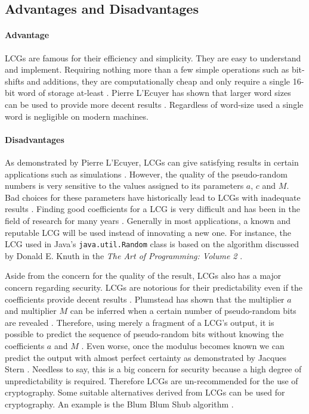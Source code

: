 \subsection{Advantages and Disadvantages}
\paragraph{Advantage} LCGs are famous for their efficiency and simplicity. They are easy to understand and implement. Requiring nothing more than a few simple operations such as bit-shifts and additions, they are computationally cheap \citep{wang_review} and only require a single 16-bit word of storage at-least \citep{yu_random}. Pierre L'Ecuyer has shown that larger word sizes can be used to provide more decent results \citep{lecuyer_tables}. Regardless of word-size used a single word is negligible on modern machines.

\paragraph{Disadvantages} 
As demonstrated by Pierre L'Ecuyer, LCGs can give satisfying results in certain applications such as simulations \citep{lecuyer_lcg_k1}. However, the quality of the pseudo-random numbers is very sensitive to the values assigned to its parameters $a$, $c$ and $M$. Bad choices for these parameters have historically lead to LCGs with inadequate results \citep{li_ooRandom}. Finding good coefficients for a LCG is very difficult and has been in the field of research for many years \citep{park_miller}. Generally in most applications, a known and reputable LCG will be used instead of innovating a new one. For instance, the LCG used in Java's \texttt{java.util.Random} class is based on the algorithm discussed by Donald E. Knuth in the {\em The Art of Programming: Volume 2} \citep{Knuth_art2}.

Aside from the concern for the quality of the result, LCGs also has a major concern regarding security. LCGs are notorious for their predictability even if the coefficients provide decent results \citep{hamid_lcgSecurity}. Plumstead has shown that the multiplier $a$ and multiplier $M$ can be inferred when a certain number of pseudo-random bits are revealed \citep{plumstead_predicting}. Therefore, using merely a fragment of a LCG's output, it is possible to predict the sequence of pseudo-random bits without knowing the coefficients $a$ and $M$ \citep{frieze_lcg}. Even worse, once the modulus becomes known we can predict the output with almost perfect certainty as demonstrated by Jacques Stern \citep{Stern_lcgInsecure}. Needless to say, this is a big concern for security because a high degree of unpredictability is required. Therefore LCGs are un-recommended for the use of cryptography. Some suitable alternatives derived from LCGs can be used for cryptography. An example is the Blum Blum Shub algorithm \citep{BlumBlumShub-1}.

